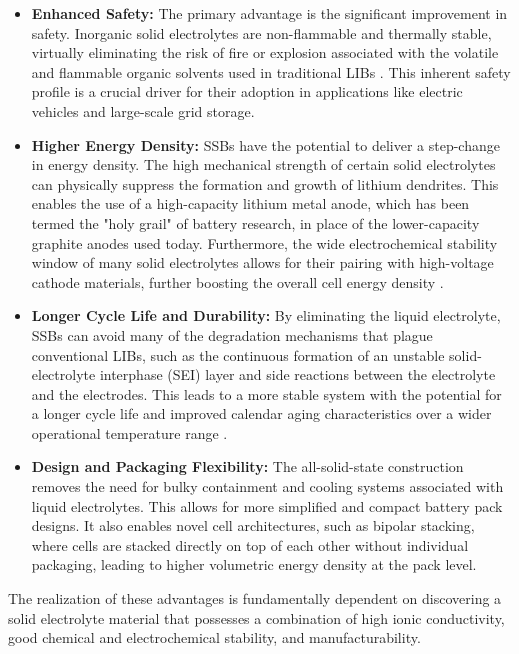\begin{itemize}
    \item \textbf{Enhanced Safety:} The primary advantage is the significant improvement in safety. Inorganic solid electrolytes are non-flammable and thermally stable, virtually eliminating the risk of fire or explosion associated with the volatile and flammable organic solvents used in traditional LIBs \cite{Manthiram2017}. This inherent safety profile is a crucial driver for their adoption in applications like electric vehicles and large-scale grid storage.

    \item \textbf{Higher Energy Density:} SSBs have the potential to deliver a step-change in energy density. The high mechanical strength of certain solid electrolytes can physically suppress the formation and growth of lithium dendrites. This enables the use of a high-capacity lithium metal anode, which has been termed the "holy grail" of battery research, in place of the lower-capacity graphite anodes used today. Furthermore, the wide electrochemical stability window of many solid electrolytes allows for their pairing with high-voltage cathode materials, further boosting the overall cell energy density \cite{Kato2016}.

    \item \textbf{Longer Cycle Life and Durability:} By eliminating the liquid electrolyte, SSBs can avoid many of the degradation mechanisms that plague conventional LIBs, such as the continuous formation of an unstable solid-electrolyte interphase (SEI) layer and side reactions between the electrolyte and the electrodes. This leads to a more stable system with the potential for a longer cycle life and improved calendar aging characteristics over a wider operational temperature range \cite{Famprikis2019}.

    \item \textbf{Design and Packaging Flexibility:} The all-solid-state construction removes the need for bulky containment and cooling systems associated with liquid electrolytes. This allows for more simplified and compact battery pack designs. It also enables novel cell architectures, such as bipolar stacking, where cells are stacked directly on top of each other without individual packaging, leading to higher volumetric energy density at the pack level.
\end{itemize}

The realization of these advantages is fundamentally dependent on discovering a solid electrolyte material that possesses a combination of high ionic conductivity, good chemical and electrochemical stability, and manufacturability.


